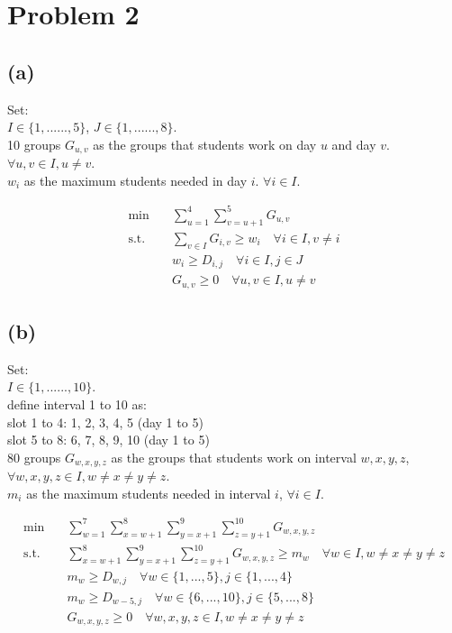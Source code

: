 \documentclass[12pt, a4paper]{article}
\begin{document}
\section{Problem 2}

\subsection{(a)}

Set:\\
$I \in \{{1,......,5}\}$, $J \in \{{1,......,8}\}$.\\
10 groups $G_{u, v}$ as the groups that students work on day $u$ and day $v$. $\forall u, v \in I, u \neq v$.\\
$w_i$ as the maximum students needed in day $i$. $\forall i \in I$.

\begin{equation}\label{eq:LP}\begin{split}
	\min \quad & \sum_{u = 1}^{4} \sum_{v = u + 1}^{5} G_{u, v}\\
	\mbox{s.t.} \quad 
	& \sum_{v \in I} G_{i, v} \geq w_i \quad \forall i \in I, v \neq i\\
	& w_i \geq D_{i, j} \quad \forall i \in I, j \in J\\
	& G_{u, v} \geq 0 \quad \forall u, v \in I, u \neq v
\end{split}\end{equation}

\subsection{(b)}
Set:\\
$I \in \{{1,......,10}\}$.\\
define interval 1 to 10 as:\\
slot 1 to 4: 1, 2, 3, 4, 5 (day 1 to 5)\\
slot 5 to 8: 6, 7, 8, 9, 10 (day 1 to 5)\\
80 groups $G_{w, x, y, z}$ as the groups that students work on interval $w, x, y, z$, $\forall w, x, y, z \in I, w \neq x \neq y \neq z$.\\
$m_i$ as the maximum students needed in interval $i$, $\forall i \in I$.

\begin{equation}\label{eq:LP}\begin{split}
	\min \quad & \sum_{w = 1}^{7} \sum_{x = w + 1}^{8} \sum_{y = x + 1}^{9} \sum_{z = y + 1}^{10} G_{w, x, y, z}\\
	\mbox{s.t.} \quad 
	& \sum_{x = w + 1}^{8} \sum_{y = x + 1}^{9} \sum_{z = y + 1}^{10} G_{w, x, y, z} \geq m_w \quad \forall w \in I, w \neq x \neq y \neq z\\
	& m_w \geq D_{w, j} \quad \forall w \in \{1,...,5\}, j \in \{1,...,4\}\\
	& m_w \geq D_{w - 5, j} \quad \forall w \in \{6,...,10\}, j \in \{5,...,8\}\\
	& G_{w, x, y, z} \geq 0 \quad \forall w, x, y, z \in I, w \neq x \neq y \neq z
\end{split}\end{equation}
\end{document}
